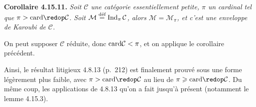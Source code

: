 \textbf{Corollaire 4.15.11.} \textit{Soit $\mathcal{C}$ une catégorie essentiellement petite, $\pi$ un cardinal tel que $\pi > \card\redop\mathcal{C}$. Soit $\mathcal{M} \defeq \Ind_\pi\mathcal{C}$, alors $\mathcal{M} = \mathcal{M}_\pi$, et c'est une enveloppe de Karoubi de $\mathcal{C}$.}

On peut supposer $\mathcal{C}$ réduite, donc $\card\mathcal{C} < \pi$, et on applique le corollaire précédent.

Ainsi, le résultat litigieux 4.8.13 (p.~212) est finalement prouvé sous une forme légèrement plus faible, avec $\pi > \card\redop\mathcal{C}$ au lieu de $\pi \geqslant \card\redop\mathcal{C}$. Du même coup, les applications de 4.8.13 qu'on a fait jusqu'à présent (notamment le lemme 4.15.3).


